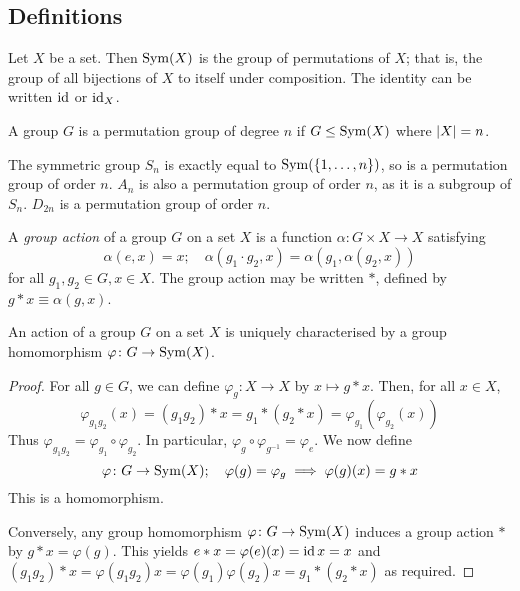 \subsection{Definitions}
\begin{definition}
	Let \( X \) be a set.
	Then \( \operatorname{Sym}(X) \) is the group of permutations of \( X \); that is, the group of all bijections of \( X \) to itself under composition.
	The identity can be written \( \operatorname{id} \) or \( \operatorname{id}_X \).
\end{definition}
\begin{definition}
	A group \( G \) is a permutation group of degree \( n \) if \( G \leq \operatorname{Sym}(X) \) where \( \abs{X} = n \).
\end{definition}
\begin{example}
	The symmetric group \( S_n \) is exactly equal to \( \operatorname{Sym}(\qty{1, \dots, n}) \), so is a permutation group of order \( n \).
	\( A_n \) is also a permutation group of order \( n \), as it is a subgroup of \( S_n \).
	\( D_{2n} \) is a permutation group of order \( n \).
\end{example}
\begin{definition}
	A \textit{group action} of a group \( G \) on a set \( X \) is a function \( \alpha \colon G \times X \to X \) satisfying
	\[
		\alpha(e, x) = x;\quad \alpha(g_1 \cdot g_2, x) = \alpha(g_1, \alpha(g_2, x))
	\]
	for all \( g_1, g_2 \in G, x \in X \).
	The group action may be written \( \ast \), defined by \( g \ast x \equiv \alpha(g,x) \).
\end{definition}
\begin{proposition}
	An action of a group \( G \) on a set \( X \) is uniquely characterised by a group homomorphism \( \varphi \colon G \to \operatorname{Sym}(X) \).
\end{proposition}
\begin{proof}
	For all \( g \in G \), we can define \( \varphi_g \colon X \to X \) by \( x \mapsto g \ast x \).
	Then, for all \( x \in X \),
	\[
		\varphi_{g_1 g_2} (x) = (g_1 g_2) \ast x = g_1 \ast (g_2 \ast x) = \varphi_{g_1}(\varphi_{g_2}(x))
	\]
	Thus \( \varphi_{g_1 g_2} = \varphi_{g_1} \circ \varphi_{g_2} \).
	In particular, \( \varphi_g \circ \varphi_{g^{-1}} = \varphi_e \).
	We now define
	\[
		\varphi \colon G \to \operatorname{Sym}(X);\quad \varphi(g) = \varphi_g \implies \varphi(g)(x) = g \ast x
	\]
	This is a homomorphism.

	Conversely, any group homomorphism \( \varphi \colon G \to \operatorname{Sym}(X) \) induces a group action \( \ast \) by \( g \ast x = \varphi(g) \).
	This yields \( e \ast x = \varphi(e)(x) = \operatorname{id} x = x \) and \( (g_1 g_2) \ast x = \varphi(g_1 g_2) x = \varphi(g_1) \varphi(g_2) x = g_1 \ast (g_2 \ast x) \) as required.
\end{proof}
